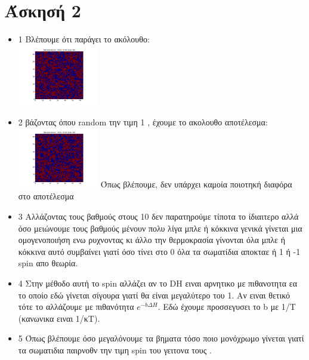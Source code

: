 \documentclass{article}
\begin{document}
\section*{Άσκησή 2}
\begin{itemize}
	\item 1
		Βλέπουμε ότι παράγει το ακόλουθο: 
	\\	\includegraphics[heigh=100pt,width=100pt]{fig1}
       \item 2
	       βάζοντας όπου random την τιμη 1 , έχουμε το ακολουθο αποτέλεσμα:
	\\	\includegraphics[heigh=100pt,width=100pt]{fig2}
		Όπως βλέπουμε, δεν υπάρχει καμοία ποιοτηκή διαφόρα στο αποτέλεσμα
	\item 3
		Αλλάζοντας τους βαθμούς στους 10 δεν παρατηρούμε τίποτα το ίδιαιτερο
		αλλά όσο μειώνουμε τους βαθμούς μένουν πολυ λίγα μπλε ή κόκκινα γενικά γίνεται μια ομογενοποιήση ενω ρυχνοντας κι άλλο την θερμοκρασία γίνονται όλα μπλε ή κόκκινα αυτό συμβαίνει γιατί όσο τίνει στο 0 όλα τα σωματίδια αποκταε ή 1 ή -1 spin απο θεωρία.
 \item 4
	 Στην μέθοδο αυτή το spin αλλάζει αν το DH ειναι αρνητικο με πιθανοτητα εα
	 το οποίο εδώ γίνεται σίγουρα γιατί θα είναι μεγαλύτερο του 1. Αν ειναι θετικό τότε το αλλάζουμε με πιθανότητα $e^{-b\Delta H}$. Εδώ έχουμε προσσεγυσει το b με 1/Τ (κανωνικα ειναι 1/κΤ). 

 \item 5
	Όπως βλέπουμε όσο μεγαλόνουμε τα βηματα τόσο ποιο μονόχρωμο γίνεται γιατί τα σωματιδια παιρνοθν την τιμη spin του γειτονα τους .
	

\end{itemize}
\end{document}
